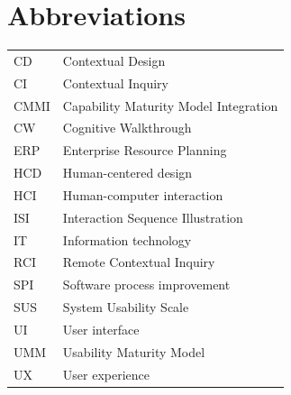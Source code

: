 \documentclass[12pt,a4paper,oneside,pdftex]{report}
\begin{document}
\chapter*{Abbreviations}


\noindent
\begin{longtable}{@{}p{}p{}@{}}
CD & Contextual Design \\
CI & Contextual Inquiry \\
CMMI & Capability Maturity Model Integration \\
CW & Cognitive Walkthrough\\
ERP & Enterprise Resource Planning \\
HCD & Human-centered design \\
HCI & Human-computer interaction \\
ISI & Interaction Sequence Illustration \\
IT & Information technology \\
RCI & Remote Contextual Inquiry \\
SPI & Software process improvement\\
SUS & System Usability Scale \\
UI & User interface \\
UMM & Usability Maturity Model \\
UX & User experience \\





\end{longtable}


\cleardoublepage
\tableofcontents
\end{document}
